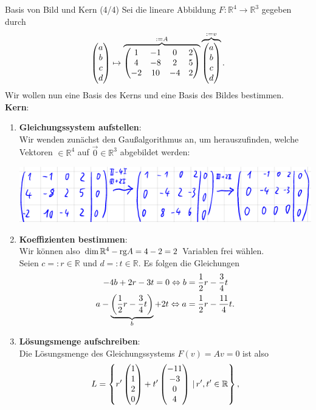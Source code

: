\begin{Beispiel}[label=beisp:basisbildkern]
{Basis von Bild und Kern (4/4)}
Sei die lineare Abbildung $F:\mathbb{R}^4\to\mathbb{R}^3$ gegeben durch
\begin{equation*}
    \begin{pmatrix}a\\b\\c\\d\end{pmatrix}\mapsto\overbrace{\begin{pmatrix}1&-1&0&2\\4&-8&2&5\\-2&10&-4&2\end{pmatrix}}^{:=A}\overbrace{\begin{pmatrix}a\\b\\c\\d\end{pmatrix}}^{:=v}.
\end{equation*}
Wir wollen nun eine Basis des Kerns und eine Basis des Bildes bestimmen.\\
\textbf{Kern}:
\begin{enumerate}
    \item \textbf{Gleichungssystem aufstellen}:\\
    Wir wenden zunächst den Gaußalgorithmus an, um herauszufinden, welche Vektoren $\in\mathbb{R}^4$ auf $\Vec{0}\in\mathbb{R}^3$ abgebildet werden:
\begin{center}
    \includegraphics[width=.5\textwidth]{Dateien/00/12BasisKernGauss.PNG}
\end{center}
    \item \textbf{Koeffizienten bestimmen}:\\
    Wir können also $\dim \mathbb{R}^4-\text{rg} A=4-2=2$ Variablen frei wählen.\\
    Seien $c=:r\in\mathbb{R}$ und $d=:t\in\mathbb{R}$. Es folgen die Gleichungen
    \begin{align*}
        -4b+2r-3t=0\Leftrightarrow b&=\frac{1}{2}r-\frac{3}{4}t\\
        a-\underbrace{\left({\frac{1}{2}r-\frac{3}{4}t}\right)}_b+2t\Leftrightarrow a&=\frac{1}{2}r-\frac{11}{4}t.
    \end{align*}
    \item \textbf{Lösungsmenge aufschreiben}:\\
    Die Lösungsmenge des Gleichungssystems $F(v)=Av=0$ ist also
    \begin{equation*}
        L=\left\{r'\Matrix{1\\1\\2\\0}+t'\Matrix{-11\\-3\\0\\4}\furdas r',t'\in\mathbb{R}\right\},

\end{equation*}
\end{enumerate}
\end{Beispiel}
